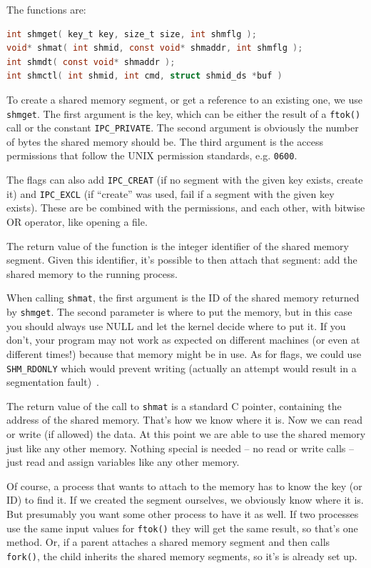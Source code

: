\documentclass[a4paper]{report}
\begin{document}
The functions are:

\begin{lstlisting}[language=C]
int shmget( key_t key, size_t size, int shmflg );
void* shmat( int shmid, const void* shmaddr, int shmflg );
int shmdt( const void* shmaddr );
int shmctl( int shmid, int cmd, struct shmid_ds *buf )
\end{lstlisting}

To create a shared memory segment, or get a reference to an existing one, we use \texttt{shmget}. The first argument is the key, which can be either the result of a \texttt{ftok()} call or the constant \texttt{IPC\_PRIVATE}. The second argument is obviously the number of bytes the shared memory should be. The third argument is the access permissions that follow the UNIX permission standards, e.g. \texttt{0600}.

The flags can also add \texttt{IPC\_CREAT} (if no segment with the given key exists, create it) and \texttt{IPC\_EXCL} (if ``create'' was used, fail if a segment with the given key exists). These are be combined with the permissions, and each other, with bitwise OR operator, like opening a file.

The return value of the function is the integer identifier of the shared memory segment. Given this identifier, it's possible to then attach that segment: add the shared memory to the running process.

When calling \texttt{shmat}, the first argument is the ID of the shared memory returned by \texttt{shmget}. The second parameter is where to put the memory, but in this case you should always use NULL and let the kernel decide where to put it. If you don't, your program may not work as expected on different machines (or even at different times!) because that memory might be in use. As for flags, we could use \texttt{SHM\_RDONLY} which would prevent writing (actually an attempt would result in a segmentation fault)~\cite{lpi}.

The return value of the call to \texttt{shmat} is a standard C pointer, containing the address of the shared memory. That's how we know where it is. Now we can read or write (if allowed) the data. At this point we are able to use the shared memory just like any other memory. Nothing special is needed -- no read or write calls -- just read and assign variables like any other memory.

Of course, a process that wants to attach to the memory has to know the key (or ID) to find it. If we created the segment ourselves, we obviously know where it is. But presumably you want some other process to have it as well. If two processes use the same input values for \texttt{ftok()} they will get the same result, so that's one method. Or, if a parent attaches a shared memory segment and then calls \texttt{fork()}, the child inherits the shared memory segments, so it's is already set up.
\end{document}
